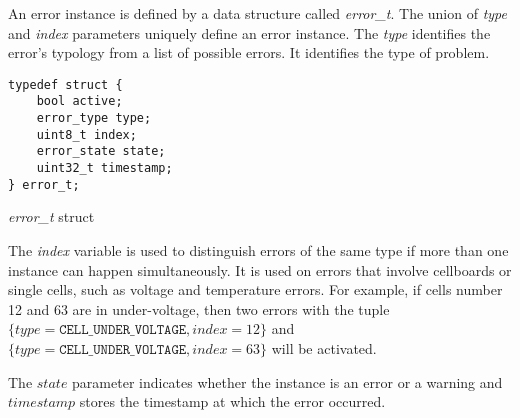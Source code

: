 An error instance is defined by a data structure called \textit{error\_t}. The union of \textit{type} and \textit{index} parameters uniquely define an error instance. The \textit{type} identifies the error's typology from a list of possible errors. It identifies the type of problem.

\begin{listing}[h]
	\begin{verbatim}
typedef struct {
	bool active;
	error_type type;
	uint8_t index;
	error_state state;
	uint32_t timestamp;
} error_t;
	\end{verbatim}
	\caption{\textit{error\_t} struct}
	\label{code:error_t}
\end{listing}

The \textit{index} variable is used to distinguish errors of the same type if more than one instance can happen simultaneously. It is used on errors that involve cellboards or single cells, such as voltage and temperature errors. For example, if cells number 12 and 63 are in under-voltage, then two errors with the tuple $\{\mathit{type} = \texttt{CELL\_UNDER\_VOLTAGE}, \mathit{index} = 12\}$ and $\{\mathit{type} = \texttt{CELL\_UNDER\_VOLTAGE}, \mathit{index} = 63\}$ will be activated.

The $\mathit{state}$ parameter indicates whether the instance is an error or a warning and $\mathit{timestamp}$ stores the timestamp at which the error occurred.

